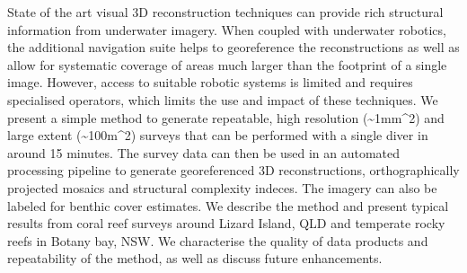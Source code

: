 State of the art visual 3D reconstruction techniques can provide rich structural information from underwater imagery. When coupled with underwater robotics, the additional navigation suite helps to georeference the reconstructions as well as allow for systematic coverage of areas much larger than the footprint of a single image. However, access to suitable robotic systems is limited and requires specialised operators, which limits the use and impact of these techniques.
We present a simple method to generate repeatable, high resolution (\sim{1mm^{2}}) and large extent (\sim{100m^{2}}) surveys that can be performed with a single diver in around 15 minutes. The survey data can then be used in an automated processing pipeline to generate georeferenced 3D reconstructions, orthographically projected mosaics and structural complexity indeces. The imagery can also be labeled for benthic cover estimates.
We describe the method and present typical results from coral reef surveys around Lizard Island, QLD and temperate rocky reefs in Botany bay, NSW. We characterise the quality of data products and repeatability of the method, as well as discuss future enhancements.